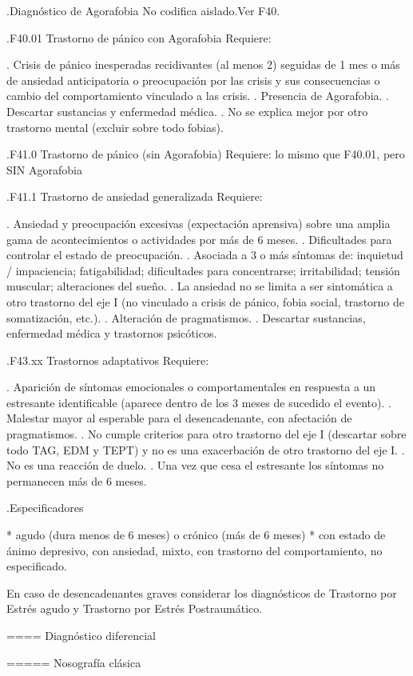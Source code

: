 \documentclass{scrbook}
\begin{document}
.Diagnóstico de Agorafobia
No codifica aislado.Ver F40.

.F40.01 Trastorno de pánico con Agorafobia
Requiere:

. Crisis de pánico inesperadas recidivantes (al menos 2) seguidas de 1 mes o más de ansiedad anticipatoria o preocupación por las crisis y sus consecuencias o cambio del comportamiento vinculado a las crisis.
. Presencia de Agorafobia.
. Descartar sustancias y enfermedad médica.
. No se explica mejor por otro trastorno mental (excluir sobre todo fobias).

.F41.0 Trastorno de pánico (sin Agorafobia)
Requiere: lo mismo que F40.01, pero SIN Agorafobia

.F41.1 Trastorno de ansiedad generalizada
Requiere:

. Ansiedad y preocupación excesivas (expectación aprensiva) sobre una amplia gama de acontecimientos o actividades por más de 6 meses.
. Dificultades para controlar el estado de preocupación.
. Asociada a 3 o más síntomas de: inquietud / impaciencia; fatigabilidad; dificultades para concentrarse; irritabilidad; tensión muscular; alteraciones del sueño.
. La ansiedad no se limita a ser sintomática a otro trastorno del eje I (no vinculado a crisis de pánico, fobia social, trastorno de somatización, etc.).
. Alteración de pragmatismos.
. Descartar sustancias, enfermedad médica y trastornos psicóticos.

.F43.xx Trastornos adaptativos
Requiere:

. Aparición de síntomas emocionales o comportamentales en respuesta a un estresante identificable (aparece dentro de los 3 meses de sucedido el evento).
. Malestar mayor al esperable para el desencadenante, con afectación de pragmatismos.
. No cumple criterios para otro trastorno del eje I (descartar sobre todo TAG, EDM y TEPT) y no es una exacerbación de otro trastorno del eje I.
. No es una reacción de duelo.
. Una vez que cesa el estresante los síntomas no permanecen más de 6 meses.

.Especificadores

* agudo (dura menos de 6 meses) o crónico (más de 6 meses)
* con estado de ánimo depresivo, con ansiedad, mixto, con trastorno del comportamiento, no especificado.

En caso de desencadenantes graves considerar los diagnósticos de Trastorno por Estrés agudo y Trastorno por Estrés Postraumático.

==== Diagnóstico diferencial

===== Nosografía clásica
\end{document}
